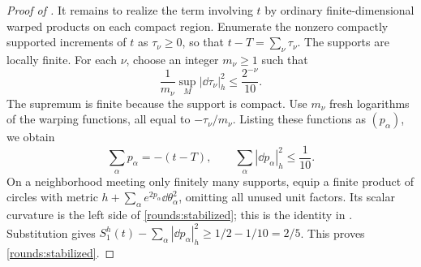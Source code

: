 \begin{proof}[Proof of ]
It remains to realize the term involving $t$ by ordinary finite-dimensional
warped products on each compact region. Enumerate the nonzero compactly
supported increments of \(t\) as \(\tau_\nu\ge0\), so that
\(t-T=\sum_\nu\tau_\nu\). The supports are locally finite. For each
\(\nu\), choose an integer \(m_\nu\ge1\) such that
\[
 \frac1{m_\nu}\sup_M|\dd\tau_\nu|_h^2\le\frac{2^{-\nu}}{10}.
\]
The supremum is finite because the support is compact. Use \(m_\nu\)
fresh logarithms of the warping functions, all equal to \(-\tau_\nu/m_\nu\). Listing these
functions as \((p_\alpha)\), we obtain
\[
 \sum_\alpha p_\alpha=-(t-T),\qquad
 \sum_\alpha|\dd p_\alpha|_h^2\le\frac1{10}.
\]
On a neighborhood meeting only finitely many supports, equip a finite
product of circles with metric
\(h+\sum_\alpha e^{2p_\alpha}\dd\theta_\alpha^2\), omitting all unused
unit factors. Its scalar curvature is the left side of
\eqref{rounds:stabilized}; this is the identity in . Substitution gives
\(S^{h}_1(t)-\sum_\alpha|\dd p_\alpha|_h^2\ge1/2-1/10=2/5\).
This proves \eqref{rounds:stabilized}.
\end{proof}


